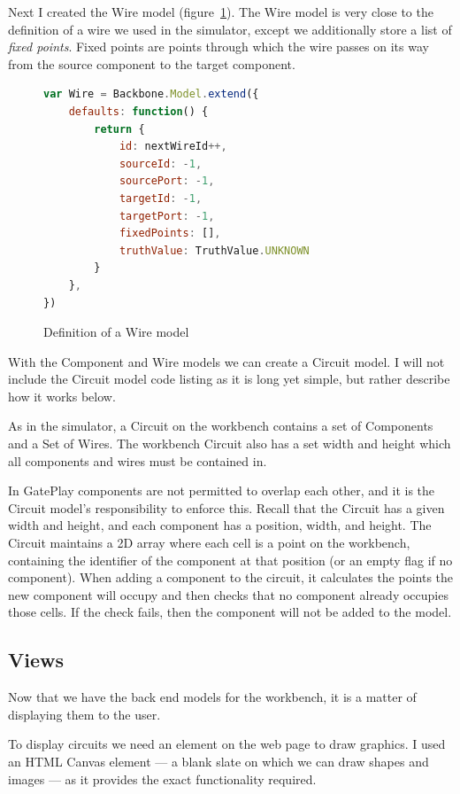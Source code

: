 Next I created the Wire model (figure~\ref{fig:wiremodel}). The Wire model is very close to the definition of a wire we used in the simulator, except we additionally store a list of \textit{fixed points}. Fixed points are points through which the wire passes on its way from the source component to the target component.

\begin{figure}
\begin{lstlisting}[language=JavaScript]
var Wire = Backbone.Model.extend({
	defaults: function() {
    	return {
        	id: nextWireId++,
        	sourceId: -1,
        	sourcePort: -1,
       	 	targetId: -1,
        	targetPort: -1,
        	fixedPoints: [],
        	truthValue: TruthValue.UNKNOWN
    	}
	},
})
\end{lstlisting}
\caption{Definition of a Wire model}
\label{fig:wiremodel}
\end{figure}

With the Component and Wire models we can create a Circuit model. I will not include the Circuit model code listing as it is long yet simple, but rather describe how it works below. 

As in the simulator, a Circuit on the workbench contains a set of Components and a Set of Wires. The workbench Circuit also has a set width and height which all components and wires must be contained in.

In GatePlay components are not permitted to overlap each other, and it is the Circuit model's responsibility to enforce this. Recall that the Circuit has a given width and height, and each component has a position, width, and height. The Circuit maintains a 2D array where each cell is a point on the workbench, containing the identifier of the component at that position (or an empty flag if no component). When adding a component to the circuit, it calculates the points the new component will occupy and then checks that no component already occupies those cells. If the check fails, then the component will not be added to the model.

\subsection{Views}
Now that we have the back end models for the workbench, it is a matter of displaying them to the user.

To display circuits we need an element on the web page to draw graphics. I used an HTML Canvas element --- a blank slate on which we can draw shapes and images --- as it provides the exact functionality required.

